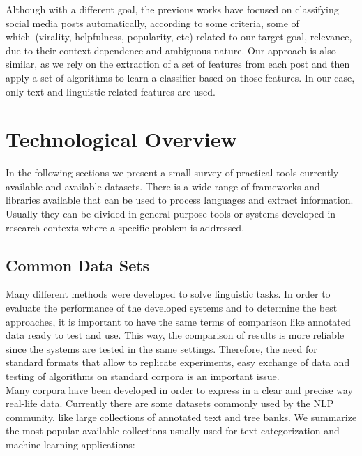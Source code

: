 Although with a different goal, the previous works have focused on classifying social media posts automatically, according to some criteria, some of which~(virality, helpfulness, popularity, etc) related to our target goal, relevance, due to their context-dependence and ambiguous nature.
Our approach is also similar, as we rely on the extraction of a set of features from each post and then apply a set of algorithms to learn a classifier based on those features. In our case, only text and linguistic-related features are used.

\section{Technological Overview}
In the following sections we present a small survey of practical tools currently available and available datasets. There is a wide range of frameworks and libraries available that can be used to process languages and extract information. Usually they can be divided in general purpose tools or systems developed in research contexts where a specific problem is addressed. 

\subsection{Common Data Sets}

Many different methods were developed to solve linguistic tasks. In order to evaluate the performance of the developed systems and to determine the best approaches, it is important to have the same terms of comparison like annotated data ready to test and use. This way, the comparison of results is more reliable since the systems are tested in the same settings. Therefore, the need for standard formats that allow to replicate experiments, easy exchange of data and testing of algorithms on standard corpora is an important issue.\\
Many corpora have been developed in order to express in a clear and precise way real-life data. Currently there are some datasets commonly used by the NLP community, like large collections of annotated text and tree banks. We summarize the most popular available collections usually used for text categorization and machine learning applications:

